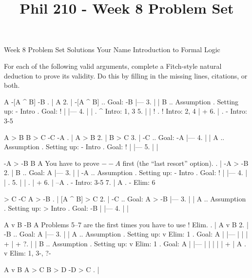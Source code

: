 
\title{Phil 210 - Week 8 Problem Set}

\heading
Week 8 Problem Set Solutions
Your Name
Introduction to Formal Logic
\endheading

For each of the following valid arguments, complete a Fitch-style natural deduction to prove its validity. Do this by filling in the missing lines, citations, or both.

\problems
{}
\argument
 A
 -[A ^ B]
\argumentline
 -B
\endargument
	\answer
	. | A
	 2. | -[A ^ B]   ..  Goal: -B
	    |---
	 3. |   | B      ..  Assumption  .  Setting up: - Intro  .  Goal: !
	    |   |---
	 4. |   |        .  ^ Intro: 1, 3
	 5. |   | !      .  ! Intro: 2, 4
	    |   +
	 6. |            .  - Intro: 3-5
	\endfitchproof
	\endanswer

\argument
 A > B
 B > C
 -C
\argumentline
 -A
\endargument
	\answer
	. | A > B
	 2. | B > C
	 3. | -C      ..  Goal: -A
	    |---
	 4. |   | A   ..  Assumption  .  Setting up: - Intro  .  Goal: !
	    |   |---
	 5. |   | 
	\endfitchproof
	\endanswer

\argument
 -A > -B
 B
\argumentline
 A
\endargument
\Hint You have to prove $--A$ first (the ``last resort'' option).
	\answer
	. | -A > -B
	 2. | B        ..  Goal: A
	    |---
	 3. |   | -A   ..  Assumption  .  Setting up: - Intro  .  Goal: !
	    |   |---
	 4. |   |      .  
	 5. |   |      .  
	    |   +
	 6. | --A      .  - Intro: 3-5
	 7. | A        .  - Elim: 6
	\endfitchproof
	\endanswer

\argument
 [A ^ B] > C
 -C
\argumentline
 A > -B
\endargument
	\answer
	. | [A ^ B] > C
	 2. | -C            .. Goal: A > -B
	    |---
	 3. |   | A         ..  Assumption  .  Setting up: > Intro  .  Goal: -B
	    |   |---
	 4. |   | 
	\endfitchproof
	\endanswer

\widerfitchsetup
{}
\argument
 A v B
 -B
\argumentline
 A
\endargument
\Hint Problems 5--7 are the first times you have to use $!$ Elim.
	\answer
	. | A v B
	 2. | -B      ..  Goal: A
	    |---
	 3. |   | A   ..  Assumption  .  Setting up: v Elim: 1  .  Goal: A
	    |   |---
	    |   | 
	    |   +
	    |   +
	 ?. |   | B   ..  Assumption  .  Setting up: v Elim: 1  .  Goal: A
	    |   |---
	    |   | 
	    |   | 
	    |   +
	    | A       .  v Elim: 1, 3-, ?-
	\endfitchproof
	\endanswer

\argument
 A v B
 A > C
 B > D
\argumentline
 -D > C
\endargument
	\answer
	. | 
	\endfitchproof
	\endanswer

